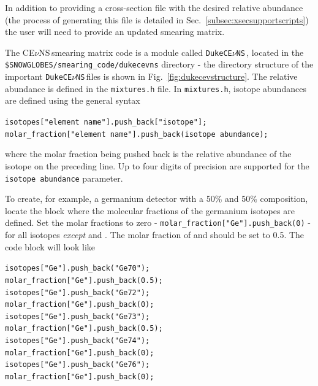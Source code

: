 \documentclass{article}
\newcommand{\cev}{CE$\nu$NS\,}
\newcommand{\dukecev}{\texttt{DukeCE$\nu$NS}\,}
\begin{document}
In addition to providing a cross-section file with the desired relative abundance (the process of generating this file is detailed in Sec.~\ref{subsec:xsecsupportscripts}) the user will need to provide an updated smearing matrix.

The \cev smearing matrix code is a module called \dukecev, located in the\\ \texttt{\$SNOWGLOBES/smearing\_code/dukecevns} directory - the directory structure of the important \dukecev files is shown in Fig.~\ref{fig:dukecevstructure}. The relative abundance is defined in the \texttt{mixtures.h} file. In \texttt{mixtures.h}, isotope abundances are defined using the general syntax

\begin{adjustwidth}{2cm}{}
    \texttt{isotopes["element name"].push\_back["isotope"];}\\
    \texttt{molar\_fraction["element name"].push\_back(isotope abundance);}
\end{adjustwidth}

\noindent where the molar fraction being pushed back is the relative abundance of the isotope on the preceding line. Up to four digits of precision are supported for the \texttt{isotope abundance} parameter.

To create, for example, a germanium detector with a 50\%  and 50\%  composition, locate the block where the molecular fractions of the germanium isotopes are defined. Set the molar fractions to zero - \texttt{molar\_fraction["Ge"].push\_back(0)} - for all isotopes \textit{except}  and . The molar fraction of  and  should be set to 0.5. The code block will look like

\begin{adjustwidth}{2cm}{}
  \texttt{isotopes["Ge"].push\_back("Ge70");}\\
  \texttt{molar\_fraction["Ge"].push\_back(0.5);}\\
  \texttt{isotopes["Ge"].push\_back("Ge72");}\\
  \texttt{molar\_fraction["Ge"].push\_back(0);}\\
  \texttt{isotopes["Ge"].push\_back("Ge73");}\\
  \texttt{molar\_fraction["Ge"].push\_back(0.5);}\\
  \texttt{isotopes["Ge"].push\_back("Ge74");}\\
  \texttt{molar\_fraction["Ge"].push\_back(0);}\\
  \texttt{isotopes["Ge"].push\_back("Ge76");}\\
  \texttt{molar\_fraction["Ge"].push\_back(0);}\\
\end{adjustwidth}
\end{document}
